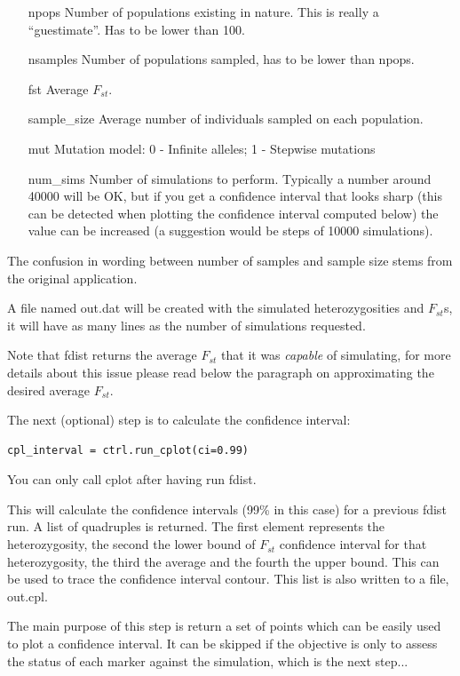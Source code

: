\documentclass{report}
\begin{document}
\begin{itemize}
\item[npops] Number of populations existing in nature. This is really a
    ``guestimate''. Has to be lower than 100.
\item[nsamples] Number of populations sampled, has to be lower than npops.
\item[fst] Average $F_{st}$.
\item[sample\_size] Average number of individuals sampled on each population.
\item[mut] Mutation model: 0 - Infinite alleles; 1 - Stepwise mutations 
\item[num\_sims] Number of simulations to perform. Typically a number around
    40000 will be OK, but if you get a confidence interval that looks sharp
    (this can be detected when plotting the confidence interval computed
    below) the value can be increased (a suggestion would be steps of 10000
    simulations).
\end{itemize}

The confusion in wording between number of samples and sample size
stems from the original application.

A file named out.dat will be created with the simulated heterozygosities
and $F_{st}$s, it will have as many lines as the number of simulations
requested.

Note that fdist returns the average $F_{st}$ that it was \emph{capable} of
simulating, for more details about this issue please read below the paragraph
on approximating the desired average $F_{st}$.

The next (optional) step is to calculate the confidence interval:

\begin{verbatim}
cpl_interval = ctrl.run_cplot(ci=0.99)
\end{verbatim}

You can only call cplot after having run fdist.

This will calculate the confidence intervals (99\% in this case)
for a previous fdist run. A list of quadruples is returned. The
first element represents the heterozygosity, the second the lower
bound of $F_{st}$ confidence interval for that heterozygosity,
the third the average and the fourth the upper bound. This can
be used to trace the confidence interval contour. This list
is also written to a file, out.cpl.

The main purpose of this step is return a set of points which can
be easily used to plot a confidence interval. It can be skipped
if the objective is only to assess the status of each marker against
the simulation, which is the next step...
\end{document}
